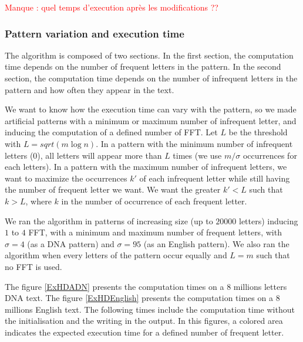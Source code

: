 \documentclass[preprint,12pt]{elsarticle}
\begin{document}
\textcolor{red}{Manque : quel temps d'execution après les modifications ??}



\subsubsection*{Pattern variation and execution time}

The algorithm is composed of two sections.
In the first section, the computation time depends
on the number of frequent letters in the pattern.
In the second section, the computation time depends on the number
of infrequent letters in the pattern and how often they appear in the text.

We want to know how the execution time can vary with the pattern,
so %
we made artificial patterns
with a minimum or maximum number of infrequent letter,
and inducing the computation of a defined number of FFT.
Let $L$ be the threshold with $L = sqrt(m \log n)$.
In a pattern with the minimum number of infrequent letters ($0$),
all letters will appear more than $L$ times
(we use $m/\sigma$ occurrences for each letters).
In a pattern with the maximum number of infrequent letters,
we want to maximize the occurrences $k'$ of each infrequent letter
while still having the number of frequent letter we want.
We want the greater $k'<L$ such that $k > L$,
where $k$ in the number of occurrence of each frequent letter.

We ran the algorithm in patterns of increasing size (up to $20 000$ letters) inducing $1$ to $4$ FFT,
with a minimum and maximum number of frequent letters, with $\sigma = 4$ (as a DNA pattern)
and $\sigma = 95$ (as an English pattern).
We also ran the algorithm when every letters of the pattern occur equally and $L=m$ such that no FFT is used.

The figure \ref{ExHDADN} presents the computation times on a $8$ millions letters DNA text.
The figure \ref{ExHDEnglish} presents the computation times on a $8$ millions English text.
The following times include the computation time without the initialisation and the writing in the output.
In this figures, a colored area indicates the expected execution time for a defined number of frequent letter.
\end{document}
